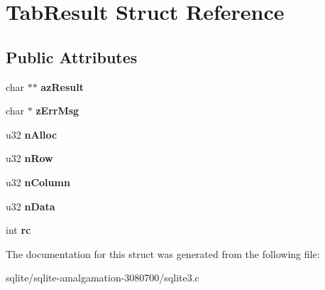 \hypertarget{struct_tab_result}{\section{Tab\+Result Struct Reference}
\label{struct_tab_result}
}
\subsection*{Public Attributes}
\begin{DoxyCompactItemize}
\item 
\hypertarget{struct_tab_result_a7446a22a7b39c17e447c65ba200490a6}{char $\ast$$\ast$ {\bfseries az\+Result}}\label{struct_tab_result_a7446a22a7b39c17e447c65ba200490a6}

\item 
\hypertarget{struct_tab_result_a6e7104bb622be05f16b6470dbb68a6c7}{char $\ast$ {\bfseries z\+Err\+Msg}}\label{struct_tab_result_a6e7104bb622be05f16b6470dbb68a6c7}

\item 
\hypertarget{struct_tab_result_a9d07a6698e6b0293cf26fa3d39d222ea}{u32 {\bfseries n\+Alloc}}\label{struct_tab_result_a9d07a6698e6b0293cf26fa3d39d222ea}

\item 
\hypertarget{struct_tab_result_a0c2a87855e7665334ec4f39cc4e2fe8b}{u32 {\bfseries n\+Row}}\label{struct_tab_result_a0c2a87855e7665334ec4f39cc4e2fe8b}

\item 
\hypertarget{struct_tab_result_a34f54427ffc26de952a3df8fd50a3cca}{u32 {\bfseries n\+Column}}\label{struct_tab_result_a34f54427ffc26de952a3df8fd50a3cca}

\item 
\hypertarget{struct_tab_result_a15ec3f09bc4ccc6945c2e76bf32cf457}{u32 {\bfseries n\+Data}}\label{struct_tab_result_a15ec3f09bc4ccc6945c2e76bf32cf457}

\item 
\hypertarget{struct_tab_result_a44bb015ce660ed3f987e324919d73f4d}{int {\bfseries rc}}\label{struct_tab_result_a44bb015ce660ed3f987e324919d73f4d}

\end{DoxyCompactItemize}


The documentation for this struct was generated from the following file\+:\begin{DoxyCompactItemize}
\item 
sqlite/sqlite-\/amalgamation-\/3080700/sqlite3.\+c\end{DoxyCompactItemize}
